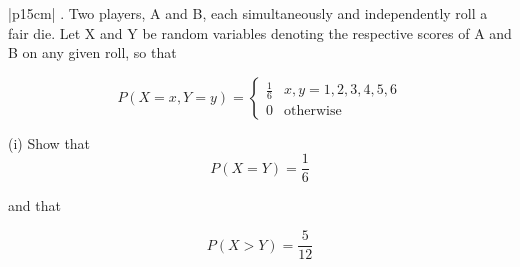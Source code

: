 \documentclass[a4paper,12pt]{article}
\begin{document}
\begin{table}[ht!]
     \centering
     \begin{tabular}{|p{15cm}|}
     . Two players, A and B, each simultaneously and independently roll a fair die.  Let X and Y be random variables denoting the respective scores of A and B on any given roll, so that 


\[   P(X=x,Y=y) = \begin{cases}  \frac{1}{6} & x,y= 1,2,3,4,5,6 \\
0 & \mbox{otherwise} \end{cases}\]

 
 
 
(i) Show that 
\[P(X=Y) = \frac{1}{6}\]
 
 
and that 
 
\[P(X>Y) = \frac{5}{12}\]
 
 \\ \hline
      \end{tabular}
    \end{table}
\end{document}
